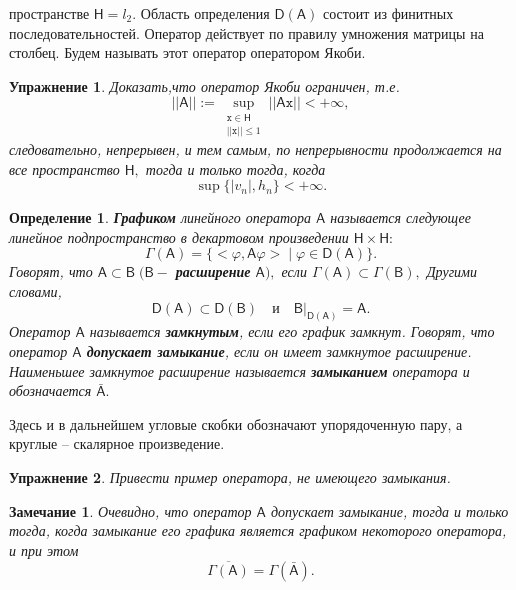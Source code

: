 \documentclass[12 pt, a4 paper]{article}
\theoremstyle{plain}   \newtheorem{Pro}{Задача}
\newtheorem{Def}{Определение}
\newtheorem{Rem}{Замечание}
\newtheorem{Exe}{Упражнение}
\begin{document}
пространстве
$ \mathsf{H}=l_2 . $
Область определения
$ \mathsf{D}(\mathsf{A}) $
состоит из финитных последовательностей.
Оператор действует по правилу умножения матрицы на столбец.
Будем называть этот оператор оператором Якоби.
\begin{Exe}
Доказать,что оператор Якоби ограничен, т.е.
$$
  ||\mathsf{A}||:=\sup _{\substack{\mathtt{x} \in \mathsf{H}\\
  ||\mathtt{x}|| \leq 1 }} ||\mathsf{A}\mathtt{x}|| < +\infty ,
$$
следовательно, непрерывен, и тем самым, по непрерывности
продолжается на все пространство
$ \mathsf{H} , $
тогда и только тогда, когда
$$
  \sup \{ |v_n |, h_n  \} < +\infty .
$$
\end{Exe}
\begin{Def}
{\bfseries Графиком}
линейного оператора
$ \mathsf{A} $
называется следующее линейное подпространство в
декартовом произведении
$ \mathsf{H} \times \mathsf{H} : $
$$
  \Gamma (\mathsf{A})=\{ <\varphi , \mathsf{A}\varphi > \; | \;
  \varphi \in \mathsf{D}(\mathsf{A}) \} .
$$
Говорят, что
$ \mathsf{A} \subset \mathsf{B} \; ( \mathsf{B} -  $
{\bfseries расширение}
$ \mathsf{A} ), $
если
$ \Gamma (\mathsf{A} ) \subset \Gamma (\mathsf{B}), $
Другими словами,
$$
  \mathsf{D}(\mathsf{A}) \subset \mathsf{D}(\mathsf{B})
  \quad и \quad \mathsf{B} \biggr | _{\mathsf{D}(\mathsf{A})}=
  \mathsf{A} .
$$
Оператор
$ \mathsf{A} $
называется
{\bfseries замкнутым},
если его график замкнут.
Говорят, что оператор
$ \mathsf{A} $
{\bfseries допускает замыкание},
если он имеет замкнутое расширение.
Наименьшее замкнутое расширение называется
{\bfseries замыканием}
оператора и обозначается
$ \bar{\mathsf{A}}. $
\end{Def}
Здесь и в дальнейшем угловые скобки обозначают упорядоченную пару,
а круглые -- скалярное произведение.
\begin{Exe}
Привести пример оператора, не имеющего замыкания.
\end{Exe}
\begin{Rem}
Очевидно, что оператор
$ \mathsf{A} $
допускает замыкание, тогда и только тогда, когда замыкание
его графика является графиком некоторого оператора, и при этом
$$
  \overline {\Gamma (\mathsf{A})}=
  \Gamma (\bar{\mathsf{A}}).
$$
\end{Rem}
\end{document}
